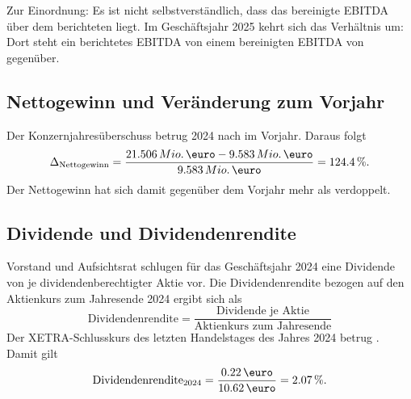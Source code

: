 \noindent Zur Einordnung: Es ist nicht selbstverst\"andlich, dass das
bereinigte EBITDA \"uber dem berichteten liegt. Im Gesch\"aftsjahr 2025 kehrt
sich das Verh\"altnis um: Dort steht ein berichtetes EBITDA von
\MioEUR{\EbitdaBerichtetZFV} einem bereinigten EBITDA von
\MioEUR{\EbitdaOpZFV} gegen\"uber.

\subsection{Nettogewinn und Ver\"anderung zum Vorjahr}
\label{subsec:nettogewinn}

Der Konzernjahres\"uberschuss betrug 2024 \MioEUR{\NettogewinnZFIV} nach
\MioEUR{\NettogewinnZFIII} im Vorjahr. Daraus folgt
\[
\Delta_{\text{Nettogewinn}}
= \frac{\MioEURexakt{\NettogewinnZFIV} - \MioEURexakt{\NettogewinnZFIII}}
       {\MioEURexakt{\NettogewinnZFIII}}
= \Pct{\NettogewinnDeltaZFIV}.
\]
Der Nettogewinn hat sich damit gegen\"uber dem Vorjahr mehr als verdoppelt.

\subsection{Dividende und Dividendenrendite}
\label{subsec:dividende}

Vorstand und Aufsichtsrat schlugen f\"ur das Gesch\"aftsjahr 2024 eine
Dividende von \EURje{\DividendeJeAktieZFIV} je dividendenberechtigter Aktie
vor. Die Dividendenrendite bezogen auf den Aktienkurs zum
Jahresende 2024 ergibt sich als
\begin{equation}
\label{eq:dividendenrendite}
\text{Dividendenrendite}
= \frac{\text{Dividende je Aktie}}{\text{Aktienkurs zum Jahresende}}
\end{equation}
Der XETRA-Schlusskurs des letzten Handelstages des Jahres 2024 betrug
\EURje{\KursSilvesterZFIV}. Damit gilt
\[
\text{Dividendenrendite}_{2024}
= \frac{\EURje{\DividendeJeAktieZFIV}}{\EURje{\KursSilvesterZFIV}}
= \Pct{\DividendenrenditeZFIV}.
\]


